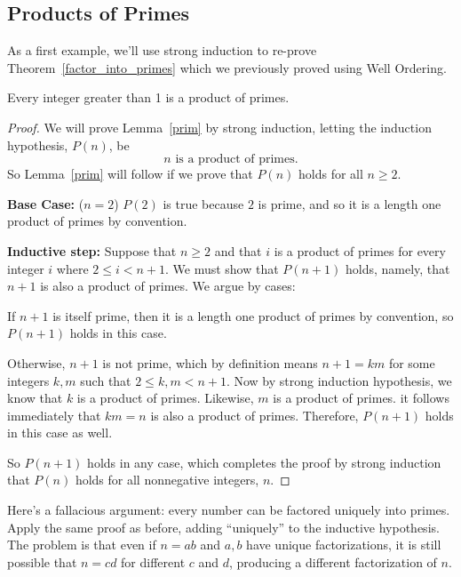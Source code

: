 \subsection{Products of Primes}

As a first example, we'll use strong induction to re-prove
Theorem~\ref{factor_into_primes} which we previously proved using Well
Ordering.

\begin{lemma}\label{prim}
Every integer greater than 1 is a product of primes.
\end{lemma}

\begin{proof}

We will prove Lemma~\ref{prim} by strong induction, letting the induction
hypothesis, $P(n)$, be
\[
n \text{ is a product of primes}.
\]
So Lemma~\ref{prim} will follow if we prove that $P(n)$ holds for all $n
\geq 2$.

\textbf{Base Case:} ($n=2$) $P(2)$ is true because $2$ is prime, and so it is
a length one product of primes by convention.

\textbf{Inductive step:} Suppose that $n \geq 2$ and that $i$ is a product
of primes for every integer $i$ where $2 \leq i < n+1$.  We must show that
$P(n+1)$ holds, namely, that $n+1$ is also a product of primes.  We argue
by cases:

If $n+1$ is itself prime, then it is a length one product of primes by
convention, so $P(n+1)$ holds in this case.

Otherwise, $n + 1$ is not prime, which by definition means $n+1 = km$ for
some integers $k,m$ such that $2 \leq k,m < n+1$.  Now by strong induction
hypothesis, we know that $k$ is a product of primes.  Likewise,
$m$ is a product of primes.  it follows immediately that $km = n$ is
also a product of primes.  Therefore, $P(n+1)$ holds in this case as well.

So $P(n+1)$ holds in any case, which completes the proof by strong
induction that $P(n)$ holds for all nonnegative integers, $n$.

\end{proof}

\iffalse

Here's a fallacious argument: every number can be factored uniquely
into primes.  Apply the same proof as before, adding ``uniquely'' to
the inductive hypothesis.  The problem is that even if $n=ab$ and
$a,b$ have unique factorizations, it is still possible that $n=cd$ for
different $c$ and $d$, producing a different factorization of $n$.

